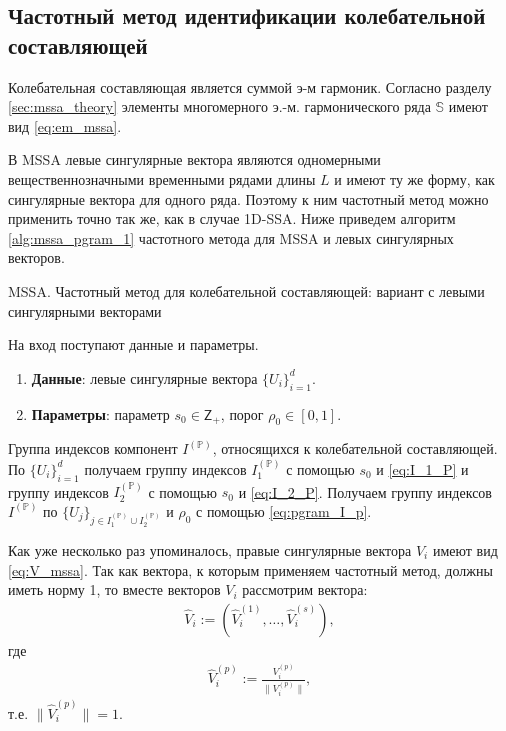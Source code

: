\documentclass[specialist,
               substylefile = spbu.rtx,
               subf,href,colorlinks=true, 12pt]{disser}
\begin{document}
\newpage
\subsection{Частотный метод идентификации колебательной составляющей}
Колебательная составляющая является суммой э-м гармоник.
Согласно разделу \ref{sec:mssa_theory} элементы многомерного э.-м. гармонического ряда $\mathbb{S}$ имеют вид \eqref{eq:em_mssa}.

В MSSA левые сингулярные вектора являются одномерными вещественнозначными временными рядами длины $L$ и имеют ту же форму, как сингулярные вектора для одного ряда. Поэтому к ним частотный метод можно применить точно так же, как в случае 1D-SSA. Ниже приведем алгоритм \ref{alg:mssa_pgram_1} частотного метода для MSSA и левых сингулярных векторов.

\begin{algorithm}[!hhh]
\caption{MSSA. Частотный метод для колебательной составляющей: вариант с левыми сингулярными векторами}
\label{alg:mssa_pgram_1}
\begin{algorithmic}[1]
\REQUIRE На вход поступают данные и параметры.
\begin{enumerate}
\item \textbf{Данные}: левые сингулярные вектора $\{U_i\}_{i=1}^{d}$.
\item \textbf{Параметры}: параметр $s_0 \in \mathsf{Z}_{+}$, порог $\rho_0 \in [0,1]$.
\end{enumerate}
\ENSURE Группа индексов компонент $I^{(\mathbb{P})}$, относящихся к колебательной составляющей.
\STATE  По $\{U_i\}_{i=1}^{d}$ получаем группу индексов $I_1^{(\mathbb{P})}$ с помощью $s_0$ и \eqref{eq:I_1_P} и группу индексов $I_2^{(\mathbb{P})}$ с помощью $s_0$ и \eqref{eq:I_2_P}.
\STATE Получаем группу индексов $I^{(\mathbb{P})}$ по $\{U_j\}_{j \in I_1^{(\mathbb{P})} \cup I_2^{(\mathbb{P})}}$ и $\rho_0$ с помощью \eqref{eq:pgram_I_p}.
\end{algorithmic}
\end{algorithm}

Как уже несколько раз упоминалось, правые сингулярные вектора $V_i$
 имеют вид \eqref{eq:V_mssa}.
Так как вектора, к которым применяем частотный метод, должны иметь норму 1, то вместе векторов $V_i$ рассмотрим вектора: 
\begin{gather*}
\widehat{V}_{i} := \left(\widehat{V}_i^{(1)}, \ldots, \widehat{V}_i^{(s)}\right),
\end{gather*}
где
\begin{gather*}
\widehat{V}_i^{(p)} := \frac{V_i^{(p)}}{\|V_i^{(p)} \|},
\end{gather*}
т.е. $\| \widehat{V}_i^{(p)} \| = 1$. 
\end{document}
